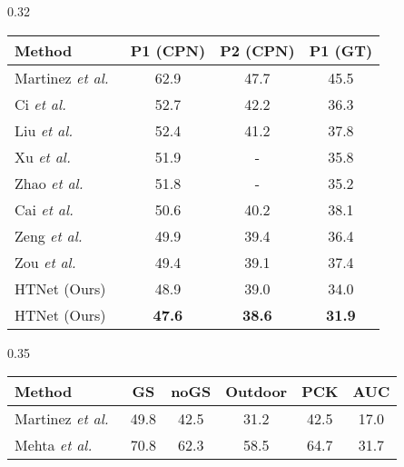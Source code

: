 \documentclass{article}
\def\VspaceTb{\vspace{-0.30cm}}
\begin{document}
\begin{table*}[t]
    \begin{subtable}[t]{0.32\textwidth}
            \footnotesize
            \centering
            \setlength{\tabcolsep}{0.70mm} 
          \begin{tabular}{@{}l|ccc}
          \toprule
            Method &\textbf{P1 (CPN)}  &\textbf{P2 (CPN)}  &\textbf{P1 (GT)}\\
          \midrule
          Martinez \textit{et al.}~\cite{simplebaseline}   &62.9 &47.7 &45.5 \\
          Ci \textit{et al.}~\cite{ci2019optimizing}  &52.7 &42.2 &36.3 \\ 
          Liu \textit{et al.}~\cite{liu2020comprehensive}   &52.4 &41.2 &37.8 \\
          Xu \textit{et al.}~\cite{xu2021graph}   &51.9 &- &35.8 \\
          Zhao \textit{et al.}~\cite{GraFormer}  &51.8 &- &{35.2} \\ 
          Cai \textit{et al.}~\cite{stgcn}   & 50.6 & 40.2& 38.1\\
          Zeng \textit{et al.}~\cite{zeng2020srnet}  &49.9 &39.4 &36.4\\
          Zou \textit{et al.}~\cite{mgcn} &{49.4} &{39.1} &37.4 \\
          \midrule
          \rowcolor[HTML]{DADADA}
          {HTNet (Ours) }  &{48.9} &{39.0} &{34.0} \\
          \rowcolor[HTML]{DADADA}
          {HTNet (Ours) }  &\textbf{47.6} &\textbf{38.6} &\textbf{31.9} \\
          \bottomrule
          \end{tabular}
          \caption{Quantitative comparison on Human3.6M.}
          \label{table:human}
          \VspaceTb
    \end{subtable}
    \hfill
    \enspace
    \begin{subtable}[t]{0.35\textwidth}
        	\centering
            \footnotesize
            \setlength{\tabcolsep}{0.50mm} 
        	\begin{tabular}{l|ccccc}
        	\toprule
        	Method  &\textbf{ GS} & \textbf{noGS} & \textbf{Outdoor} & \textbf{PCK} & \textbf{AUC}        \\
        	\midrule
        	Martinez \textit{et al.}~\cite{simplebaseline}  & 49.8 &42.5 &31.2 &42.5 & 17.0 \\
        	Mehta \textit{et al.}~\cite{mehta2017monocular}  & 70.8 &62.3 &58.5 &64.7 &31.7 \\

\end{tabular}
\end{subtable}
\end{table*}
\end{document}
